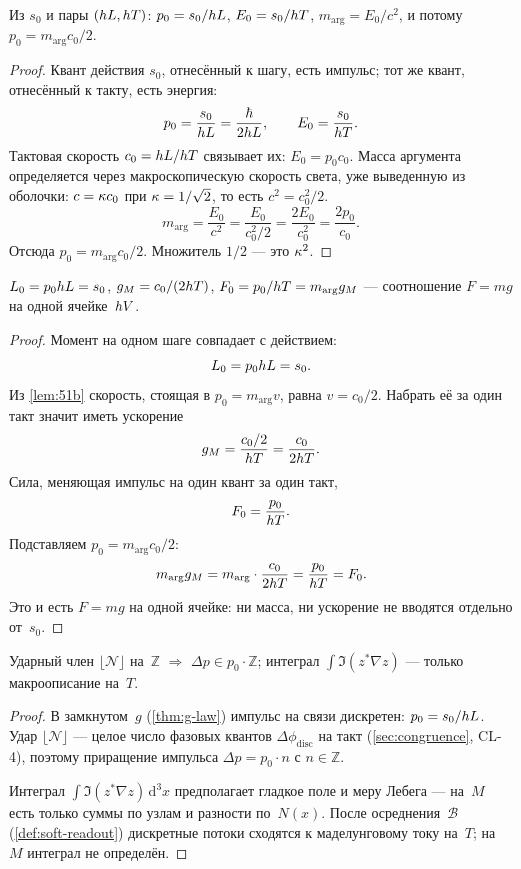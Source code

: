 \begin{lemma}[5.1b]
\label{lem:51b}
Из $s_0$ и пары $(hL,hT)$: $p_0=s_0/hL$, $E_0=s_0/hT$, $m_{\arg}=E_0/c^2$,
и потому $p_0=m_{\arg} c_0/2$.
\end{lemma}

\begin{proof}
Квант действия $s_0$, отнесённый к шагу, есть импульс; тот же квант, отнесённый к такту, есть энергия:
\[
  p_0=\frac{s_0}{hL}=\frac{\hbar}{2hL},\qquad
  E_0=\frac{s_0}{hT}.
\]
Тактовая скорость $c_0=hL/hT$ связывает их: $E_0=p_0 c_0$.
Масса аргумента определяется через макроскопическую скорость света, уже выведенную из оболочки:
$c=\kappa c_0$ при $\kappa=1/\sqrt{2}$, то есть $c^2=c_0^2/2$.
\[
  m_{\arg}=\frac{E_0}{c^2}=\frac{E_0}{c_0^2/2}=\frac{2E_0}{c_0^2}=\frac{2p_0}{c_0}.
\]
Отсюда $p_0=m_{\arg} c_0/2$.
Множитель $1/2$ --- это $\kappa^2$.
\end{proof}

\begin{lemma}[5.1c]
\label{lem:51c}
$L_0=p_0hL=s_0$, $g_M=c_0/(2hT)$, $F_0=p_0/hT=m_{\arg} g_M$ ---
соотношение $F=mg$ на одной ячейке~$hV$.
\end{lemma}

\begin{proof}
Момент на одном шаге совпадает с действием:
\[
  L_0=p_0hL=s_0.
\]
Из \cref{lem:51b} скорость, стоящая в $p_0=m_{\arg} v$, равна $v=c_0/2$.
Набрать её за один такт значит иметь ускорение
\[
  g_M=\frac{c_0/2}{hT}=\frac{c_0}{2hT}.
\]
Сила, меняющая импульс на один квант за один такт,
\[
  F_0=\frac{p_0}{hT}.
\]
Подставляем $p_0=m_{\arg} c_0/2$:
\[
  m_{\arg} g_M=m_{\arg}\cdot\frac{c_0}{2hT}=\frac{p_0}{hT}=F_0.
\]
Это и есть $F=mg$ на одной ячейке: ни масса, ни ускорение не вводятся отдельно от~$s_0$.
\end{proof}

\begin{lemma}[5.1d]
\label{lem:51d}
Ударный член $\lfloor\mathcal{N}\rfloor$ на~$\mathbb{Z}$ $\Rightarrow$ $\Delta p\in p_0\cdot\mathbb{Z}$;
интеграл $\int\Im(z^*\nabla z)$ --- только макроописание на~$T$.
\end{lemma}

\begin{proof}
В замкнутом~$g$ (\cref{thm:g-law}) импульс на связи дискретен: $p_0=s_0/hL$.
Удар $\lfloor\mathcal{N}\rfloor$ --- целое число фазовых квантов $\Delta\phi_{\mathrm{disc}}$
на такт (\cref{sec:congruence}, CL-4), поэтому приращение импульса
$\Delta p=p_0\cdot n$ с $n\in\mathbb{Z}$.

\smallskip
Интеграл $\int\Im(z^*\nabla z)\,\mathrm{d}^3x$ предполагает гладкое поле и меру Лебега ---
на~$M$ есть только суммы по узлам и разности по~$N(x)$.
После осреднения~$\mathcal{B}$ (\cref{def:soft-readout}) дискретные потоки сходятся
к маделунговому току на~$T$; на~$M$ интеграл не определён.
\end{proof}

